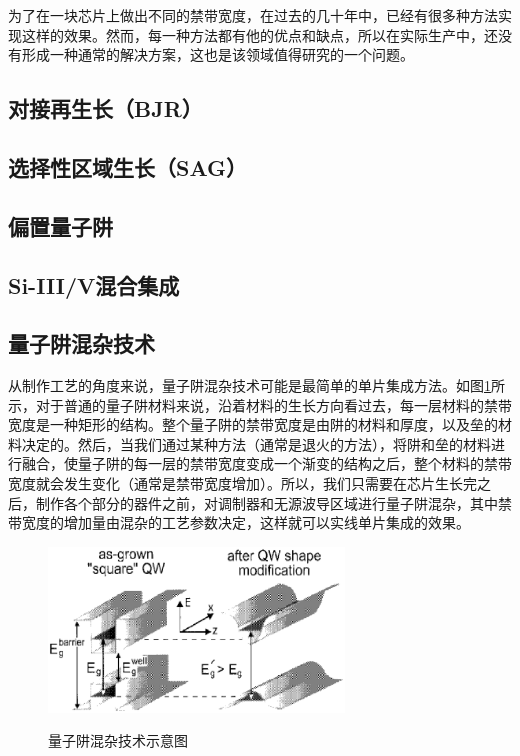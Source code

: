 \documentclass{ZJUthesis}
\begin{document}
为了在一块芯片上做出不同的禁带宽度，在过去的几十年中，已经有很多种方法实现这样的效果。然而，每一种方法都有他的优点和缺点，所以在实际生产中，还没有形成一种通常的解决方案，这也是该领域值得研究的一个问题。

\subsection{对接再生长（BJR）}

\subsection{选择性区域生长（SAG）}

\subsection{偏置量子阱}

\subsection{Si-III/V混合集成}

\subsection{量子阱混杂技术}

从制作工艺的角度来说，量子阱混杂技术可能是最简单的单片集成方法。如图\ref{fig_qwi}所示，对于普通的量子阱材料来说，沿着材料的生长方向看过去，每一层材料的禁带宽度是一种矩形的结构。整个量子阱的禁带宽度是由阱的材料和厚度，以及垒的材料决定的。然后，当我们通过某种方法（通常是退火的方法），将阱和垒的材料进行融合，使量子阱的每一层的禁带宽度变成一个渐变的结构之后，整个材料的禁带宽度就会发生变化（通常是禁带宽度增加）。所以，我们只需要在芯片生长完之后，制作各个部分的器件之前，对调制器和无源波导区域进行量子阱混杂，其中禁带宽度的增加量由混杂的工艺参数决定，这样就可以实线单片集成的效果。

\begin{figure}[htb]
  \centering
  \includegraphics[width=0.7\textwidth]{./Pictures/qwi.eps}\\
  \caption{量子阱混杂技术示意图}
  \label{fig_qwi}
\end{figure}
\end{document}
